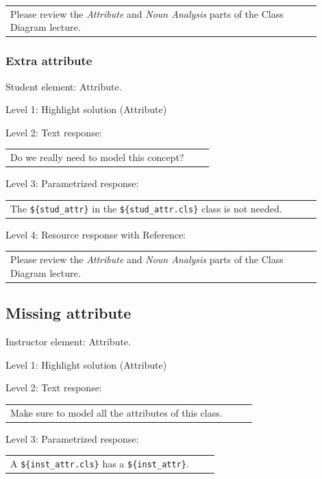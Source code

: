 \begin{tabular}{|p{0.9\linewidth}}
Please review the \textit{Attribute} and \textit{Noun Analysis} parts of the Class Diagram lecture.
\end{tabular} \medskip


\subsubsection{Extra attribute}

Student element: Attribute.  \medskip

\noindent Level 1: Highlight solution (Attribute) \medskip

\noindent Level 2: Text response: \medskip

\begin{tabular}{|p{0.9\linewidth}}
Do we really need to model this concept?
\end{tabular} \medskip

\noindent Level 3: Parametrized response: \medskip

\begin{tabular}{|p{0.9\linewidth}}
The \verb|${stud_attr}| in the \verb|${stud_attr.cls}| class is not needed.
\end{tabular} \medskip

\noindent Level 4: Resource response with Reference: \medskip

\begin{tabular}{|p{0.9\linewidth}}
Please review the \textit{Attribute} and \textit{Noun Analysis} parts of the Class Diagram lecture.
\end{tabular} \medskip


\subsection{Missing attribute}

Instructor element: Attribute. \medskip

\noindent Level 1: Highlight solution (Attribute) \medskip

\noindent Level 2: Text response: \medskip

\begin{tabular}{|p{0.9\linewidth}}
Make sure to model all the attributes of this class.
\end{tabular} \medskip

\noindent Level 3: Parametrized response: \medskip

\begin{tabular}{|p{0.9\linewidth}}
A \verb|${inst_attr.cls}| has a \verb|${inst_attr}|.
\end{tabular} \medskip

